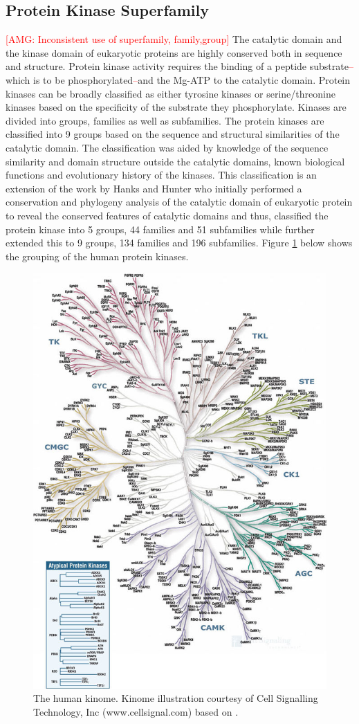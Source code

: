 \documentclass[a4paper, 11pt]{article}
\newcommand{\redcomment}[1]{\textcolor{red}{[#1]}} %
\newcommand{\redinsert}[1]{\textcolor{red}{#1}} %
\begin{document}
\subsection*{Protein Kinase Superfamily}
\redcomment{AMG: Inconsistent use of superfamily, family,group}
The catalytic domain and the kinase domain of eukaryotic proteins are highly conserved both in sequence and structure. Protein kinase activity requires the binding of a peptide substrate\redinsert{--}which is to be phosphorylated\redinsert{--}and the Mg-ATP to the catalytic domain. Protein kinases can be broadly classified as either tyrosine kinases or serine/threonine kinases based on the specificity of the substrate they phosphorylate. Kinases are divided into groups, families as well as subfamilies. The protein kinases are classified into 9 groups based on the sequence and structural similarities of the catalytic domain. The classification was aided by knowledge of the sequence similarity and domain structure outside the catalytic domains, known biological functions and evolutionary history of the kinases. This classification is an extension of the work by Hanks and Hunter who initially performed a conservation and phylogeny analysis of the catalytic domain of eukaryotic protein to reveal the conserved features of catalytic domains and thus, classified the protein kinase into 5 groups, 44 families and 51 subfamilies \cite{hanks1995protein} while \cite{manning2002protein} further extended this to 9 groups, 134 families and 196 subfamilies. Figure \ref{KinomeDendogram} below shows the grouping of the human protein kinases.\\
\begin{figure}[H]
	\includegraphics[width=.8\linewidth]{figures/kinome.jpg}
	\centering
	\caption{The human kinome. Kinome illustration courtesy of Cell Signalling 			Technology, Inc (www.cellsignal.com) based on \cite{manning2002protein}.}
	\label{KinomeDendogram}
\end{figure}
\end{document}
